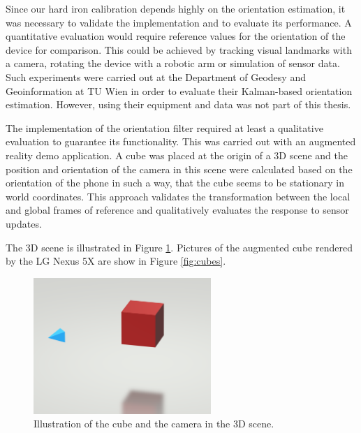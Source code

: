 Since our hard iron calibration depends highly on the orientation estimation, it was necessary to validate the implementation and to evaluate its performance. A quantitative evaluation would require reference values for the orientation of the device for comparison. This could be achieved by tracking visual landmarks with a camera, rotating the device with a robotic arm or simulation of sensor data. Such experiments were carried out at the Department of Geodesy and Geoinformation at TU Wien in order to evaluate their Kalman-based orientation estimation.\cite{Ettlinger2018} However, using their equipment and data was not part of this thesis.

The implementation of the orientation filter required at least a qualitative evaluation to guarantee its functionality. This was carried out with an augmented reality demo application. A cube was placed at the origin of a 3D scene and the position and orientation of the camera in this scene were calculated based on the orientation of the phone in such a way, that the cube seems to be stationary in world coordinates. This approach validates the transformation between the local and global frames of reference and qualitatively evaluates the response to sensor updates.

The 3D scene is illustrated in Figure \ref{fig:cube_scene}. Pictures of the augmented cube rendered by the LG Nexus 5X are show in Figure \ref{fig:cubes}.

\begin{figure}[hbt!]
    \centering
    \includegraphics[width=0.6\textwidth]{figures/cube_scene.png}
    \caption{Illustration of the cube and the camera in the 3D scene.}
    \label{fig:cube_scene}
\end{figure}

